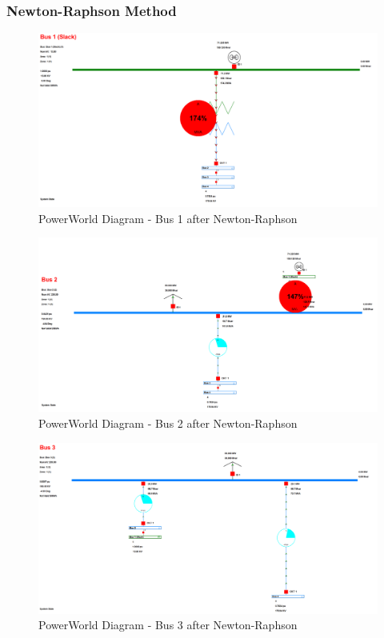 \documentclass[12pt]{article}
\begin{document}
        \subsubsection{Newton-Raphson Method}
        \begin{figure}[H]
            \centerline{\includegraphics[scale=0.25]{images/PowerWorldBus1}}
            \caption{PowerWorld Diagram - Bus 1 after Newton-Raphson}
        \end{figure}

        \begin{figure}[H]
            \centerline{\includegraphics[scale=0.25]{images/PowerWorldBus2}}
            \caption{PowerWorld Diagram - Bus 2 after Newton-Raphson}
        \end{figure}

        \begin{figure}[H]
            \centerline{\includegraphics[scale=0.25]{images/PowerWorldBus3}}
            \caption{PowerWorld Diagram - Bus 3 after Newton-Raphson}
        \end{figure}
\end{document}
